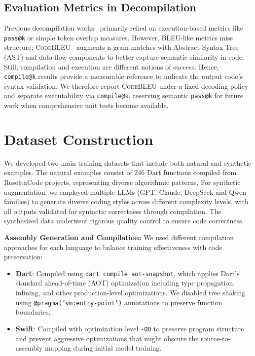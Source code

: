 \documentclass[10pt,conference]{IEEEtran}
\makeatletter
\newcommand{\codebleu}{\textsc{CodeBLEU}\xspace}
\newcommand{\compileatk}{\texttt{compile@k}\xspace}
\newcommand{\passatk}{\texttt{pass@k}\xspace}
\makeatother
\begin{document}
\subsection{Evaluation Metrics in Decompilation}
Previous decompilation works~\cite{slade2024,nova2023,llm4decompile2024} primarily relied on execution-based metrics like \passatk{} or simple token overlap measures. However, BLEU-like metrics miss structure; \codebleu{}~\cite{codebleu2021} augments n-gram matches with Abstract Syntax Tree (AST) and data-flow components to better capture semantic similarity in code. Still, compilation and execution are different notions of success. Hence, \compileatk{} results provide a measurable reference to indicate the output code's syntax validation. We therefore report \codebleu{} under a fixed decoding policy and separate executability via \compileatk{}, reserving semantic \passatk{} for future work when comprehensive unit tests become available.

\section{Dataset Construction}

We developed two main training datasets that include both natural and synthetic examples. The natural examples consist of 246 Dart functions compiled from RosettaCode projects, representing diverse algorithmic patterns. For synthetic augmentation, we employed multiple LLMs (GPT, Claude, DeepSeek and Qwen families) to generate diverse coding styles across different complexity levels, with all outputs validated for syntactic correctness through compilation. The synthesized data underwent rigorous quality control to ensure code correctness.

\textbf{Assembly Generation and Compilation:}
We used different compilation approaches for each language to balance training effectiveness with code preservation:
\begin{itemize}[leftmargin=*]
\item \textbf{Dart}: Compiled using \texttt{dart compile aot-snapshot}, which applies Dart's standard ahead-of-time (AOT) optimization including type propagation, inlining, and other production-level optimizations. We disabled tree shaking using \texttt{@pragma('vm:entry-point')} annotations to preserve function boundaries.
\item \textbf{Swift}: Compiled with optimization level \texttt{-O0} to preserve program structure and prevent aggressive optimizations that might obscure the source-to-assembly mapping during initial model training.
\end{itemize}
\end{document}
